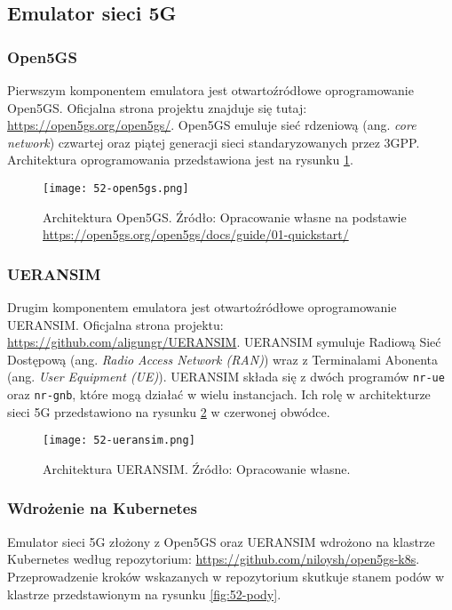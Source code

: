 \subsection{Emulator sieci 5G}

\subsubsection{Open5GS}

Pierwszym komponentem emulatora jest otwartoźródłowe oprogramowanie Open5GS. Oficjalna strona projektu znajduje się tutaj: \url{https://open5gs.org/open5gs/}. Open5GS emuluje sieć rdzeniową (ang. \textit{core network}) czwartej oraz piątej generacji sieci standaryzowanych przez 3GPP. Architektura oprogramowania przedstawiona jest na rysunku \ref{fig:52-open5gs}.

\begin{figure}[!h]
    \centering \texttt{[image: 52-open5gs.png]}
    \caption{Architektura Open5GS. Źródło: Opracowanie własne na podstawie \url{https://open5gs.org/open5gs/docs/guide/01-quickstart/}}\label{fig:52-open5gs}
\end{figure}

\subsubsection{UERANSIM}

Drugim komponentem emulatora jest otwartoźródłowe oprogramowanie UERANSIM. Oficjalna strona projektu: \url{https://github.com/aligungr/UERANSIM}. UERANSIM symuluje Radiową Sieć Dostępową (ang. \textit{Radio Access Network (RAN)}) wraz z Terminalami Abonenta (ang. \textit{User Equipment (UE)}). UERANSIM składa się z dwóch programów \texttt{nr-ue} oraz \texttt{nr-gnb}, które mogą działać w wielu instancjach. Ich rolę w architekturze sieci 5G przedstawiono na rysunku \ref{fig:52-ueransim} w czerwonej obwódce.

\begin{figure}[!h]
    \centering \texttt{[image: 52-ueransim.png]}
    \caption{Architektura UERANSIM. Źródło: Opracowanie własne.}\label{fig:52-ueransim}
\end{figure}

\subsubsection{Wdrożenie na Kubernetes}

Emulator sieci 5G złożony z Open5GS oraz UERANSIM wdrożono na klastrze Kubernetes według repozytorium: \url{https://github.com/niloysh/open5gs-k8s}. Przeprowadzenie kroków wskazanych w repozytorium skutkuje stanem podów w klastrze przedstawionym na rysunku \ref{fig:52-pody}.

